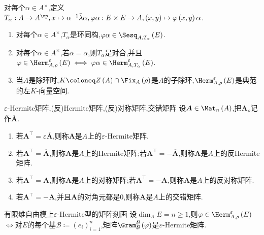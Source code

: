 \begin{remark}{}{}
	对每个$\alpha\in A^{\times}$,定义$T_{\alpha}:A\to A^{\op},x\mapsto\alpha^{-1}\bar{\lambda}\alpha,\varphi\alpha:E\times E\to A,\left(x,y\right)\mapsto\varphi\left(x,y\right)\alpha$.
	\begin{enumerate}
		\item 对每个$\alpha\in A^{\times}$,$T_{\alpha}$是环同构,$\varphi\alpha\in\Sesq_{A,T_{\alpha}}\left(E\right)$.
		\item 对每个$\alpha\in A^{\times}$,若$\bar{\alpha}=\alpha$,则$T_{\alpha}$是对合,并且$\varphi\in\Herm_{A,\rho}^{\varepsilon}\left(E\right)\iff\varphi\alpha\in\Herm_{A,T_{\alpha}}^{\varepsilon}\left(E\right)$.
		\item 当$A$是除环时,$K\coloneq Z\left(A\right)\cap\Fix_{A}\left(\rho\right)$是$A$的子除环,$\Herm_{A,\rho}^{\varepsilon}\left(E\right)$是典范的左$K$-向量空间.
	\end{enumerate}
\end{remark}

\begin{definition}{$\varepsilon$-Hermite矩阵,(反)Hermite矩阵,(反)对称矩阵,交错矩阵}{}
	设$\boldsymbol{A}\in\Mat_{n}\left(A\right)$,把$\boldsymbol{A}_{\rho}$记作$\overline{\boldsymbol{A}}$.
	\begin{enumerate}
		\item 若$\boldsymbol{A}^{\top}=\varepsilon\overline{\boldsymbol{A}}$,则称$\boldsymbol{A}$是$A$上的$\varepsilon$-Hermite矩阵.
		\item 若$\boldsymbol{A}^{\top}=\overline{\boldsymbol{A}}$,则称$\boldsymbol{A}$是$A$上的Hermite矩阵;若$\boldsymbol{A}^{\top}=-\overline{\boldsymbol{A}}$,则称$\boldsymbol{A}$是$A$上的反Hermite矩阵.
		\item 若$\boldsymbol{A}^{\top}=\boldsymbol{A}$,则称$\boldsymbol{A}$是$A$上的对称矩阵;若$\boldsymbol{A}^{\top}=-\boldsymbol{A}$,则称$\boldsymbol{A}$是$A$上的反对称矩阵.
		\item 若$\boldsymbol{A}^{\top}=-\boldsymbol{A}$,并且$\boldsymbol{A}$的对角元都是$0$,则称$\boldsymbol{A}$是$A$上的交错矩阵.
	\end{enumerate}
\end{definition}

\begin{proposition}{有限维自由模上$\varepsilon$-Hermite型的矩阵刻画}{}
	设$\dim_{A}E=n\geq 1$,则$\varphi\in\Herm_{A,\rho}^{\varepsilon}\left(E\right)$ $\iff$对$E$的每个基$\mathcal{B}\coloneq\left(e_{i}\right)_{i=1}^{n}$,矩阵$\Gram_{\mathcal{B}}^{\mathcal{B}}\left(\varphi\right)$是$\varepsilon$-Hermite矩阵.
\end{proposition}

